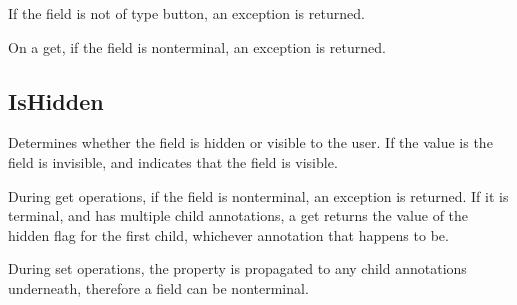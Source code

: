 \documentclass[letterpaper,12pt,english,openany,oneside]{sphinxmanual}
\begin{document}
\begin{sphinxVerbatim}[commandchars=\\\{\}]
\PYG{p}{[}\PYG{p}{]} 
\end{sphinxVerbatim}
\label{\detokenize{IAC_API_FormsIntro:exceptions-11}}

If the field is not of type button, an exception  is returned.

On a get, if the field is non\sphinxhyphen{}terminal, an exception  is returned.

\label{\detokenize{IAC_API_FormsIntro:example-12}}

\begin{sphinxVerbatim}[commandchars=\\\{\}]
  
\end{sphinxVerbatim}




\subsection{IsHidden}
\label{\detokenize{IAC_API_FormsIntro:ishidden}}
Determines whether the field is hidden or visible to the user. If the value is  the field is invisible, and  indicates that the field is visible.

During get operations, if the field is non\sphinxhyphen{}terminal, an exception  is returned. If it is terminal, and has multiple child annotations, a get returns the value of the hidden flag for the first child, whichever annotation that happens to be.

During set operations, the property is propagated to any child annotations underneath, therefore a field can be non\sphinxhyphen{}terminal.

\label{\detokenize{IAC_API_FormsIntro:syntax-19}}

\begin{sphinxVerbatim}[commandchars=\\\{\}]
\PYG{p}{[}\PYG{p}{]} 
\end{sphinxVerbatim}
\label{\detokenize{IAC_API_FormsIntro:example-13}}
\end{document}
